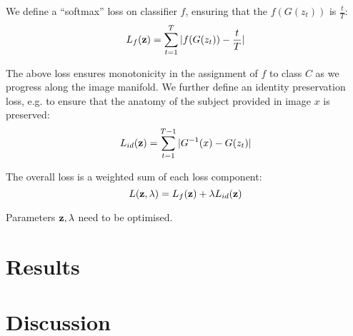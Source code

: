 \documentclass{article}
\begin{document}
We define a ``softmax'' loss on classifier $f$, ensuring that the $f(G(z_t))$ is $\frac{t}{T}$: 
\begin{equation}
L_f(\textbf{z}) = \sum_{t=1}^{T} |f(G(z_{t})) - \frac{t}{T}| 
\end{equation}

The above loss ensures monotonicity in the assignment of $f$ to class $C$ as we progress along the image manifold. We further define an identity preservation loss, e.g. to ensure that the anatomy of the subject provided in image $x$ is preserved:
\begin{equation}
L_{id}(\textbf{z}) = \sum_{t=1}^{T-1} |G^{-1}(x) - G(z_t)| 
\end{equation}

The overall loss is a weighted sum of each loss component:
\begin{equation}
L(\textbf{z}, \lambda) = L_f(\textbf{z}) + \lambda L_{id}(\textbf{z}) 
\end{equation}

Parameters $\textbf{z}, \lambda$ need to be optimised.

\section{Results}

\section{Discussion}









% 
% 
% 
\end{document}
